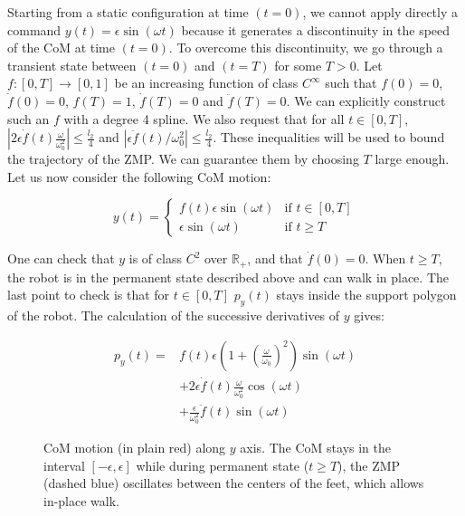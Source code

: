 \documentclass{article}
\begin{document}
Starting from a static configuration at time $(t=0)$, we cannot apply
directly  a  command  $y(t)  =  \epsilon \sin(\omega  t)$  because  it
generates  a discontinuity  in the  speed of  the CoM  at time $(t=0)$. To
overcome this  discontinuity, we go through a  transient state between
$(t=0)$ and  $(t=T)$ for some  $T >0$. Let  $f:[0,T] \rightarrow
[0,1]$  be an  increasing function of class $C^\infty$  such  that  $f(0)  =  0$,
$\dot{f}(0) = 0$, $f(T) =  1$, $\dot{f}(T) = 0$ and $\ddot{f}(T)
=  0$.  We can explicitly  construct  such  an $f$   with  a degree  4
spline.   We   also   request   that   for  all   $t   \in   [0,T]$,
$|2\epsilon\dot{f}(t)\frac{\omega}{\omega_0^2}|   \leq  \frac{l_2}{4}$
and   $|\epsilon\ddot{f}(t)/\omega_0^2|  \leq   \frac{l_2}{4}$.  These
inequalities  will be  used  to bound  the  trajectory of  the  ZMP. We  can
guarantee them by  choosing $T$ large enough. Let  us now consider the
following CoM motion:

\[
y(t) = \left\{
\begin{array}{ll}
f(t)\epsilon\sin(\omega t) 
& \text{if } t\in [0,T]
\\ 
\epsilon\sin(\omega t) 
& \text{if } t \geq T \end{array}
\right.
\]

One can  check that $y$  is of class $C^2$ over  $\mathbb{R}_+$, and
that $\dot{f}(0) = 0$. When $t\geq T$, the robot is in the permanent
state described above  and can walk in place. The  last point to check
is that for $t \in  [0,T]$ $p_y(t)$ stays inside the support polygon
of the robot. The calculation of the successive derivatives of $y$ gives:

\[
\begin{array}{cl}
p_y(t) = &  f(t) \epsilon (1 + \left(\frac{\omega}{\omega_0}\right)^2)
\sin (\omega  t) \\ &  + 2\epsilon \dot{f}(t)\frac{\omega}{\omega_0^2}
\cos  (\omega t)  \\ &  +  \frac{\epsilon}{\omega_0^2}\ddot{f}(t) \sin
(\omega t)
\end{array}
\]


\begin{figure}
\centering


\caption{CoM motion (in plain red) along $y$ axis.  The CoM stays in the interval
  $[-\epsilon,\epsilon]$ while during  permanent state ($t \geq T$),
  the ZMP (dashed blue) oscillates between the centers of the feet, which allows
  in-place walk.}
\label{fig:zmp-inplace}
\end{figure}
\end{document}
